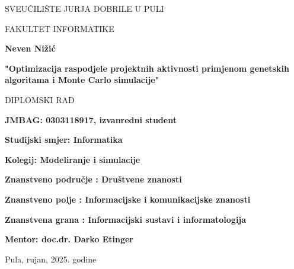 \begin{center}
SVEUČILIŠTE JURJA DOBRILE U PULI 

FAKULTET INFORMATIKE

\vspace{45mm} 

\textbf{Neven Nižić}

\vspace{20mm} 

\textbf{"Optimizacija raspodjele projektnih aktivnosti primjenom genetskih algoritama i Monte Carlo simulacije"}

\vspace{5mm}
DIPLOMSKI RAD

\end{center}

\vspace{45mm}

\textbf{JMBAG: 0303118917, izvanredni student}

\textbf{Studijski smjer: Informatika}
\bigskip

\textbf{Kolegij: Modeliranje i simulacije}

\textbf{Znanstveno područje : Društvene znanosti}

\textbf{Znanstveno polje : Informacijske i komunikacijske znanosti}

\textbf{Znanstvena grana : Informacijski sustavi i informatologija}
\bigskip

\textbf{Mentor: doc.dr. Darko Etinger}

\vfill

\begin{center}

Pula, rujan, 2025. godine

\end{center}
